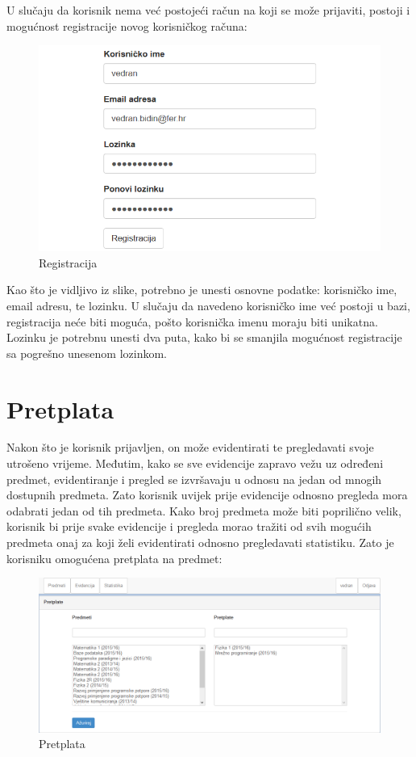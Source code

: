\documentclass[times, utf8, zavrsni]{fer}
\begin{document}
U slučaju da korisnik nema već postojeći račun na koji se može prijaviti, postoji i mogućnost registracije novog korisničkog računa:\\

\begin{figure}[H]
\centering
\includegraphics[width=\textwidth,height=\textheight,keepaspectratio]{img/registracija.png}
\caption{Registracija}
\label{fig:registracija}
\end{figure}
\clearpage

Kao što je vidljivo iz slike, potrebno je unesti osnovne podatke: korisničko ime, email adresu, te lozinku. U slučaju da navedeno korisničko ime već postoji u bazi, registracija neće biti moguća, pošto korisnička imenu moraju biti unikatna. Lozinku je potrebnu unesti dva puta, kako bi se smanjila mogućnost registracije sa pogrešno unesenom lozinkom.

\section{Pretplata}
Nakon što je korisnik prijavljen, on može evidentirati te pregledavati svoje utrošeno vrijeme. Međutim, kako se sve evidencije zapravo vežu uz određeni predmet, evidentiranje i pregled se izvršavaju u odnosu na jedan od mnogih dostupnih predmeta. Zato korisnik uvijek prije evidencije odnosno pregleda mora odabrati jedan od tih predmeta. Kako broj predmeta može biti poprilično velik, korisnik bi prije svake evidencije i pregleda morao tražiti od svih mogućih predmeta onaj za koji želi evidentirati odnosno pregledavati statistiku. Zato je korisniku omogućena pretplata na predmet:

\begin{figure}[H]
\centering
\includegraphics[width=\textwidth,height=\textheight,keepaspectratio]{img/pretplata-web.png}
\caption{Pretplata}
\label{fig:pretplata-web}
\end{figure}
\end{document}

